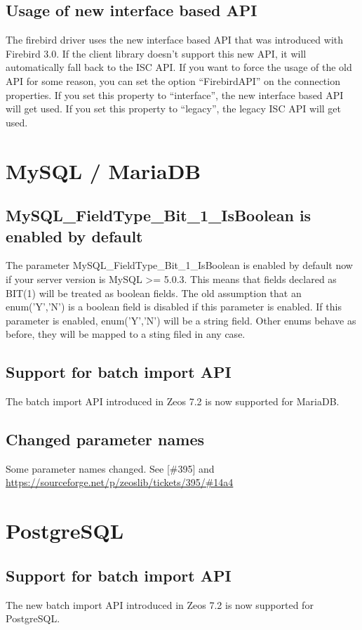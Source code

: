 \documentclass[a4paper,12pt,oneside]{article}
\begin{document}
\subsection{Usage of new interface based API}
The firebird driver uses the new interface based API that was introduced with Firebird 3.0.
If the client library doesn't support this new API, it will automatically fall back to the ISC API.
If you want to force the usage of the old API for some reason, you can set the option "`FirebirdAPI"' on the connection properties.
If you set this property to "`interface"', the new interface based API will get used.
If you set this property to "`legacy"', the legacy ISC API will get used.

\section{MySQL / MariaDB}

\subsection{MySQL\_FieldType\_Bit\_1\_IsBoolean is enabled by default}

The parameter MySQL\_FieldType\_Bit\_1\_IsBoolean is enabled by default now if your server version is MySQL >= 5.0.3.
This means that fields declared as BIT(1) will be treated as boolean fields.
The old assumption that an enum('Y','N') is a boolean field is disabled if this parameter is enabled.
If this parameter is enabled, enum('Y','N') will be a string field.
Other enums behave as before, they will be mapped to a sting filed in any case.

\subsection{Support for batch import API}
The batch import API introduced in Zeos 7.2 is now supported for MariaDB.

\subsection{Changed parameter names}
Some parameter names changed.
See [\#395] and \url{https://sourceforge.net/p/zeoslib/tickets/395/#14a4}

\section{PostgreSQL}

\subsection{Support for batch import API}
The new batch import API introduced in Zeos 7.2 is now supported for PostgreSQL.
\end{document}
